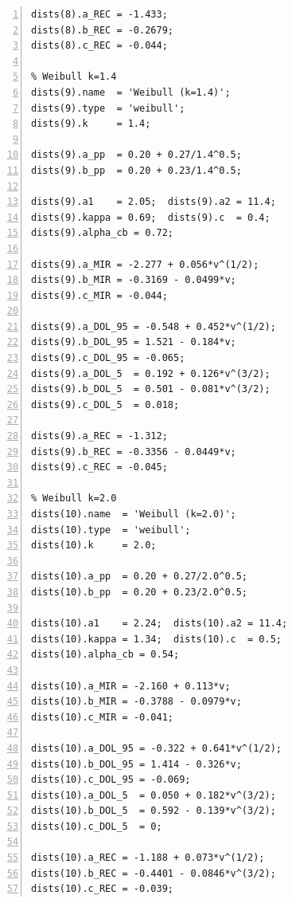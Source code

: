 \documentclass[a4paper, 11pt]{article}
\begin{document}
\begin{lstlisting}[frame=single, numbers=left, style=Matlab-Pyglike]
dists(8).a_REC = -1.433;
dists(8).b_REC = -0.2679;
dists(8).c_REC = -0.044;

% Weibull k=1.4
dists(9).name  = 'Weibull (k=1.4)';
dists(9).type  = 'weibull';
dists(9).k     = 1.4;

dists(9).a_pp  = 0.20 + 0.27/1.4^0.5;
dists(9).b_pp  = 0.20 + 0.23/1.4^0.5;

dists(9).a1    = 2.05;  dists(9).a2 = 11.4;
dists(9).kappa = 0.69;  dists(9).c  = 0.4;  
dists(9).alpha_cb = 0.72;

dists(9).a_MIR = -2.277 + 0.056*v^(1/2);
dists(9).b_MIR = -0.3169 - 0.0499*v;
dists(9).c_MIR = -0.044;

dists(9).a_DOL_95 = -0.548 + 0.452*v^(1/2); 
dists(9).b_DOL_95 = 1.521 - 0.184*v;        
dists(9).c_DOL_95 = -0.065;
dists(9).a_DOL_5  = 0.192 + 0.126*v^(3/2);  
dists(9).b_DOL_5  = 0.501 - 0.081*v^(3/2);  
dists(9).c_DOL_5  = 0.018;

dists(9).a_REC = -1.312;
dists(9).b_REC = -0.3356 - 0.0449*v;
dists(9).c_REC = -0.045;

% Weibull k=2.0
dists(10).name  = 'Weibull (k=2.0)';
dists(10).type  = 'weibull';
dists(10).k     = 2.0;

dists(10).a_pp  = 0.20 + 0.27/2.0^0.5;
dists(10).b_pp  = 0.20 + 0.23/2.0^0.5;

dists(10).a1    = 2.24;  dists(10).a2 = 11.4;
dists(10).kappa = 1.34;  dists(10).c  = 0.5;  
dists(10).alpha_cb = 0.54;

dists(10).a_MIR = -2.160 + 0.113*v;
dists(10).b_MIR = -0.3788 - 0.0979*v;
dists(10).c_MIR = -0.041;

dists(10).a_DOL_95 = -0.322 + 0.641*v^(1/2); 
dists(10).b_DOL_95 = 1.414 - 0.326*v;       
dists(10).c_DOL_95 = -0.069;
dists(10).a_DOL_5  = 0.050 + 0.182*v^(3/2);  
dists(10).b_DOL_5  = 0.592 - 0.139*v^(3/2); 
dists(10).c_DOL_5  = 0;

dists(10).a_REC = -1.188 + 0.073*v^(1/2);
dists(10).b_REC = -0.4401 - 0.0846*v^(3/2);
dists(10).c_REC = -0.039;
\end{lstlisting}
\end{document}
